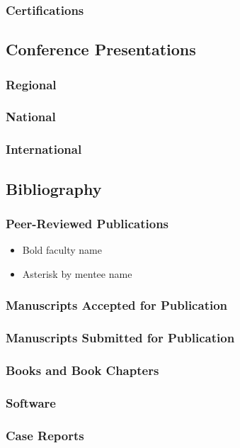 \documentclass[
  16,
]{article}
\providecommand{\tightlist}{%
  \setlength{\itemsep}{0pt}\setlength{\parskip}{0pt}}\usepackage{longtable,booktabs,array}
\begin{document}
\subsubsection{Certifications}\label{certifications}

\subsection{Conference Presentations}\label{conference-presentations}

\subsubsection{Regional}\label{regional-1}

\subsubsection{National}\label{national-2}

\subsubsection{International}\label{international-2}

\subsection{Bibliography}\label{bibliography}

\subsubsection{Peer-Reviewed
Publications}\label{peer-reviewed-publications}

\begin{itemize}
\tightlist
\item
  Bold faculty name
\item
  Asterisk by mentee name
\end{itemize}

\subsubsection{Manuscripts Accepted for
Publication}\label{manuscripts-accepted-for-publication}

\subsubsection{Manuscripts Submitted for
Publication}\label{manuscripts-submitted-for-publication}

\subsubsection{Books and Book Chapters}\label{books-and-book-chapters}

\subsubsection{Software}\label{software}

\subsubsection{Case Reports}\label{case-reports}
\end{document}
